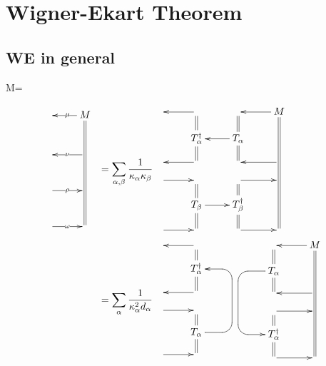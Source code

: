 \chapter{Wigner-Ekart Theorem}
\label{ch-wigner-ekart}

\section{WE in general}

\beq
M=
\bcen
{}
\ecen
\eeq

\begin{align}
\bcen
\xymatrix@R=1pc{
&M\ar@2{-}[dddddd]
\ar[l]|\mu
\\&
\\
&\ar[l]|\nu
\\&
\\
\ar[r]|\rho&
\\&
\\
\ar[r]|\omega&
}
\ecen
&=
\sum_{\alp, \beta}
\frac{1}{\kappa_\alp \kappa_\beta}
\bcen
\xymatrix@R=1pc{
&\ar[l]&&M
\ar@2{-}[ddddd]
\ar[l]
\\
&T_\alp^\dagger\ar@2{-}[u]
\ar@2{-}[d]&T_\alp\ar@2{-}[u]
\ar@2{-}[d]
\ar[l]
&
\\
&\ar[l]&&\ar[l]
\\
\ar[r]&&\ar[r]&
\\
&T_\beta
\ar@2{-}[u]
\ar@2{-}[d]
\ar[r]
&T_\beta^\dagger\ar@2{-}[u]
\ar@2{-}[d]
&
\\
\ar[r]&&\ar[r]&
}
\ecen
\\
&=
\sum_{\alp}
\frac{1}{\kappa^2_\alp d_\alp}
\bcen
\xymatrix@R=1pc{
&\ar[l]&
\\
&T_\alp^\dagger\ar@2{-}[u]
\ar@2{-}[d]
&
\\
&\ar[l]&
\\
\ar[r]&&
\\
&T_\alp
\ar@2{-}[u]
\ar@2{-}[d]
\ar`r[ruuu]
`[uuu][uuu]
&
\\
\ar[r]&&
}
\xymatrix@R=1pc{
&&M
\ar@2{-}[ddddd]
\ar[l]
\\
&T_\alp\ar@2{-}[u]
\ar@2{-}[d]
\ar`l[ld]
`[ddd][ddd]
&
\\
&&\ar[l]
\\
&\ar[r]&
\\
&T_\alp^\dagger\ar@2{-}[u]
\ar@2{-}[d]
&
\\
&\ar[r]&
}
\ecen
\end{align}


